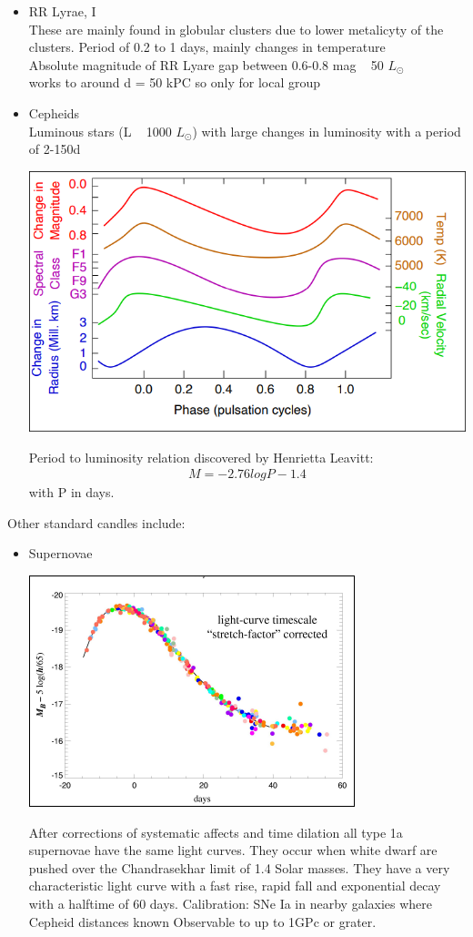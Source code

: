 \documentclass[11pt,a4paper]{article}
\begin{document}
\begin{itemize}
    \item RR Lyrae, I \\ 
        These are mainly found in globular clusters due to lower metalicyty of the clusters.
        Period of 0.2 to 1 days, mainly changes in temperature\\ 
        Absolute magnitude of RR Lyare gap between 0.6-0.8 mag ~ 50 $L_\odot$ \\
        works to around d = 50 kPC so only for local group
    \item Cepheids \\ 
        Luminous stars (L ~ 1000 $L_\odot$) with large changes in luminosity with a period of 2-150d
\begin{center}
    \includegraphics[width=0.5\linewidth]{screenshot_2024-01-23-113927.png}
\end{center}
    Period to luminosity relation discovered by Henrietta Leavitt: 
     \begin{align*}
       M = -2.76 log P - 1.4 
     \end{align*}
     with P in days.
\end{itemize}
Other standard candles include: 
\begin{itemize}
    \item Supernovae 
\begin{center}
    \includegraphics[width=0.5\linewidth]{screenshot_2024-01-23-114223.png}
\end{center}
After corrections of systematic affects and time dilation all type 1a supernovae have the same light curves.
They occur when white dwarf are pushed over the Chandrasekhar limit of 1.4 Solar masses.
They have a very characteristic light curve with a fast rise, rapid fall and exponential decay with a halftime of 60 days.
Calibration: SNe Ia in nearby galaxies where Cepheid distances known
Observable to up to 1GPc or grater.
\end{itemize}
\end{document}
